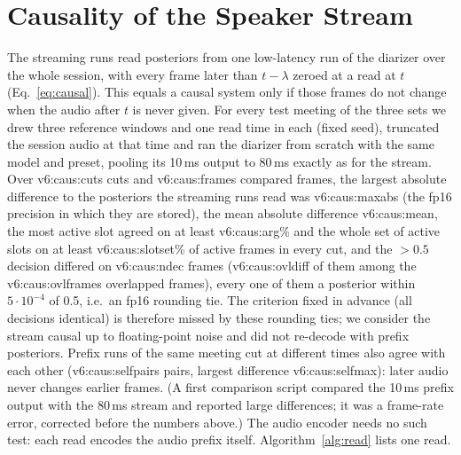 \section{Causality of the Speaker Stream}
\label{app:causal}

The streaming runs read posteriors from one low-latency run of the diarizer over the whole session, with every frame
later than $t-\lambda$ zeroed at a read at $t$ (Eq.~\ref{eq:causal}). This equals a causal system only if those frames
do not change when the audio after $t$ is never given. For every test meeting of the three sets we drew three reference
windows and one read time in each (fixed seed), truncated the session audio at that time and ran the diarizer from
scratch with the same model and preset, pooling its 10\,ms output to 80\,ms exactly as for the stream. Over
\num{v6:caus:cuts} cuts and \num{v6:caus:frames} compared frames, the largest absolute difference to the posteriors the
streaming runs read was \num{v6:caus:maxabs} (the fp16 precision in which they are stored), the mean absolute difference \num{v6:caus:mean},
the most active slot agreed on at least \num{v6:caus:arg}\% and the whole set of active slots on at least
\num{v6:caus:slotset}\% of active frames in every cut, and the $>0.5$ decision differed on \num{v6:caus:ndec} frames
(\num{v6:caus:ovldiff} of them among the \num{v6:caus:ovlframes} overlapped frames), every one of them a posterior within
$5\cdot10^{-4}$ of 0.5, i.e.\ an fp16 rounding tie. The criterion fixed in advance (all decisions
identical) is therefore missed by these rounding ties; we consider the stream causal up to floating-point noise and did
not re-decode with prefix posteriors. Prefix runs of the same meeting cut at different times also agree with each other
(\num{v6:caus:selfpairs} pairs, largest difference \num{v6:caus:selfmax}): later audio never changes earlier frames.
(A first comparison script compared the 10\,ms prefix output with the 80\,ms stream and reported large differences; it
was a frame-rate error, corrected before the numbers above.) The audio encoder needs no such test: each read
encodes the audio prefix itself. Algorithm~\ref{alg:read} lists one read.

